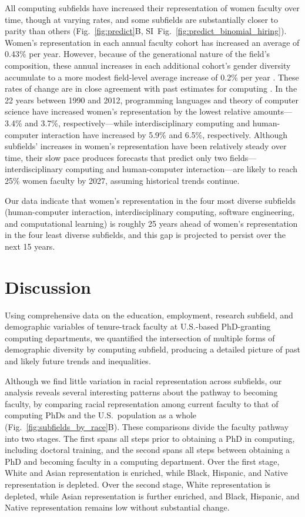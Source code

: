 \documentclass[reprint, twocolumn, aps, nofootinbib, superscriptaddress, longbibliography]{revtex4-1}
\begin{document}
All computing subfields have increased their representation of women faculty over time, though at varying rates, and some subfields are substantially closer to parity than others (Fig.~\ref{fig:predict}B, SI~Fig.~\ref{fig:predict_binomial_hiring}). Women's representation in each annual faculty cohort has increased an average of 0.43\% per year. However, because of the generational nature of the field's composition, these annual increases in each additional cohort's gender diversity accumulate to a more modest field-level average increase of 0.2\% per year \cite{hargens2002demographic, marschke2007demographic}. These rates of change are in close agreement with past estimates for computing \cite{way2016gender, holman2018gender}. In the 22 years between 1990 and 2012, programming languages and theory of computer science have increased women's representation by the lowest relative amounts—3.4\% and 3.7\%, respectively—while interdisciplinary computing and human-computer interaction have increased by 5.9\% and 6.5\%, respectively. Although subfields’ increases in women's representation have been relatively steady over time, their slow pace produces forecasts that predict only two fields—interdisciplinary computing and human-computer interaction—are likely to reach 25\% women faculty by 2027, assuming historical trends continue. 

Our data indicate that women's representation in the four most diverse subfields (human-computer interaction, interdisciplinary computing, software engineering, and computational learning) is roughly 25 years ahead of women's representation in the four least diverse subfields, and this gap is projected to persist over the next 15 years. 

\section{Discussion} \label{sec:discussion}

Using comprehensive data on the education, employment, research subfield, and demographic variables of tenure-track faculty at U.S.-based PhD-granting computing departments, we quantified the intersection of multiple forms of demographic diversity by computing subfield, producing a detailed picture of past and likely future trends and inequalities. 

Although we find little variation in racial representation across subfields, our analysis reveals several interesting patterns about the pathway to becoming faculty, by comparing racial representation among current faculty to that of computing PhDs and the U.S.~population as a whole (Fig.~\ref{fig:subfields_by_race}B). These comparisons divide the faculty pathway into two stages. The first spans all steps prior to obtaining a PhD in computing, including doctoral training, and the second spans all steps between obtaining a PhD and becoming faculty in a computing department. Over the first stage, White and Asian representation is enriched, while Black, Hispanic, and Native representation is depleted. Over the second stage, White representation is depleted, while Asian representation is further enriched, and Black, Hispanic, and Native representation remains low without substantial change. 
\end{document}

